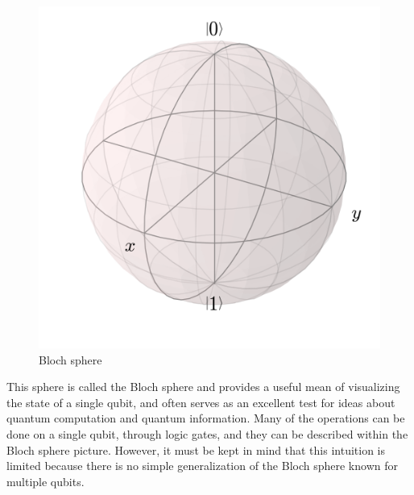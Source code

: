 \begin{figure}[h!]
    \centering
    \includegraphics[scale=0.5]{Mainmatter/images/bloch-empty.png}
    \caption{Bloch sphere}
    \label{sphere:bloch}
\end{figure}
This sphere is called the Bloch sphere and provides a useful mean of visualizing the state of a single qubit, and often serves as an excellent test for ideas about quantum computation and quantum information.
Many of the operations can be done on a single qubit, through logic gates, and they can be described within the Bloch sphere picture.
However, it must be kept in mind that this intuition is limited because there is no simple generalization of the Bloch sphere known for multiple qubits.

